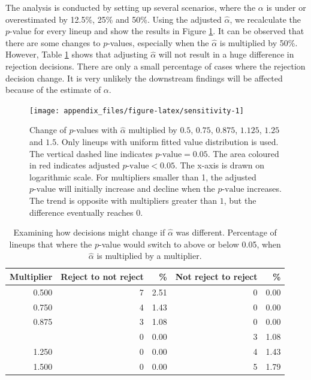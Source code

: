 \documentclass[]{interact}
\theoremstyle{plain}%
\theoremstyle{definition}
\theoremstyle{remark}
\begin{document}
The analysis is conducted by setting up several scenarios, where the
\(\alpha\) is under or overestimated by 12.5\%, 25\% and 50\%. Using the
adjusted \(\hat{\alpha}\), we recalculate the \(p\)-value for every
lineup and show the results in Figure \ref{fig:sensitivity}. It can be
observed that there are some changes to \(p\)-values, especially when
the \(\hat{\alpha}\) is multiplied by 50\%. However, Table
\ref{tab:sensitivity} shows that adjusting \(\hat{\alpha}\) will not
result in a huge difference in rejection decisions. There are only a
small percentage of cases where the rejection decision change. It is
very unlikely the downstream findings will be affected because of the
estimate of \(\alpha\).

\begin{figure}

{\centering \texttt{[image: appendix\_files/figure-latex/sensitivity-1]} 

}

\caption{Change of $p$-values with $\hat{\alpha}$ multiplied by $0.5$, $0.75$, $0.875$, $1.125$, $1.25$ and $1.5$. Only lineups with uniform fitted value distribution is used. The vertical dashed line indicates $p\text{-value} = 0.05$. The area coloured in red indicates $\text{adjusted }p\text{-value} < 0.05$. The x-axis is drawn on logarithmic scale. For multipliers smaller than 1, the adjusted $p\text{-value}$ will initially increase and decline when the $p\text{-value}$ increases. The trend is opposite with multipliers greater than $1$, but the difference eventually reaches $0$.}\label{fig:sensitivity}
\end{figure}

\begin{table}

\caption{\label{tab:sensitivity}Examining how decisions might change if $\hat{\alpha}$ was different. Percentage of lineups that where the $p$-value would switch to above or below 0.05, when $\hat{\alpha}$ is multiplied by a multiplier.}
\centering
\begin{tabular}[t]{rrrrr}
\toprule
Multiplier & Reject to not reject & \% & Not reject to reject & \%\\
\midrule
0.500 & 7 & 2.51 & 0 & 0.00\\
0.750 & 4 & 1.43 & 0 & 0.00\\
0.875 & 3 & 1.08 & 0 & 0.00\\
\addlinespace
1.125 & 0 & 0.00 & 3 & 1.08\\
1.250 & 0 & 0.00 & 4 & 1.43\\
1.500 & 0 & 0.00 & 5 & 1.79\\
\bottomrule
\end{tabular}
\end{table}
\end{document}
